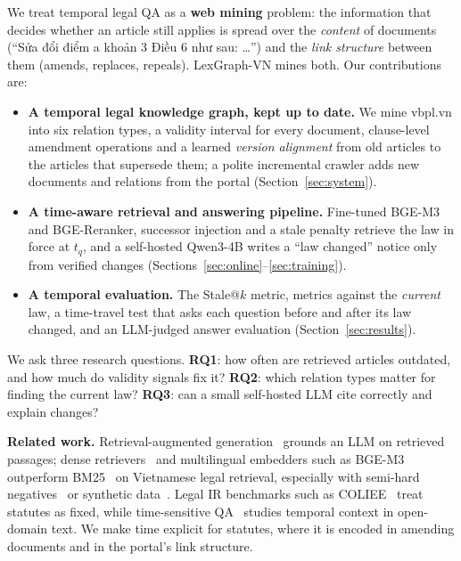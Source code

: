 \documentclass{article} %
\begin{document}
We treat temporal legal QA as a \textbf{web mining} problem: the information that decides whether an article still
applies is spread over the \emph{content} of documents (``Sửa đổi điểm a khoản 3 Điều 6 như sau: \dots'') and the
\emph{link structure} between them (amends, replaces, repeals). LexGraph-VN mines both. Our contributions are:
\begin{itemize}
\item \textbf{A temporal legal knowledge graph, kept up to date.} We mine vbpl.vn into six relation types, a validity
interval for every document, \AmOps{} clause-level amendment operations and a learned \emph{version alignment} from old
articles to the articles that supersede them; a polite incremental crawler adds new documents and relations from the
portal (Section~\ref{sec:system}).
\item \textbf{A time-aware retrieval and answering pipeline.} Fine-tuned BGE-M3 and BGE-Reranker, successor injection
and a stale penalty retrieve the law in force at $t_q$, and a self-hosted Qwen3-4B writes a ``law changed'' notice only
from verified changes (Sections~\ref{sec:online}--\ref{sec:training}).
\item \textbf{A temporal evaluation.} The Stale@$k$ metric, metrics against the \emph{current} law, a time-travel test
that asks each question before and after its law changed, and an LLM-judged answer evaluation
(Section~\ref{sec:results}).
\end{itemize}
We ask three research questions. \textbf{RQ1}: how often are retrieved articles outdated, and how much do validity
signals fix it? \textbf{RQ2}: which relation types matter for finding the current law? \textbf{RQ3}: can a small
self-hosted LLM cite correctly and explain changes?



\textbf{Related work.} Retrieval-augmented generation~\citep{lewis2020rag} grounds an LLM on retrieved passages; dense
retrievers~\citep{karpukhin2020dpr,reimers2019sbert} and multilingual embedders such as BGE-M3~\citep{chen2024bgem3}
outperform BM25~\citep{robertson2009bm25} on Vietnamese legal retrieval, especially with semi-hard
negatives~\citep{le2025semihard} or synthetic data~\citep{son2024synthetic}. Legal IR benchmarks such as
COLIEE~\citep{rabelo2022coliee} treat statutes as fixed, while time-sensitive QA~\citep{chen2021timeqa,
zhang2021situatedqa,liska2022streamingqa} studies temporal context in open-domain text. We make time explicit for
statutes, where it is encoded in amending documents and in the portal's link structure.
\end{document}
